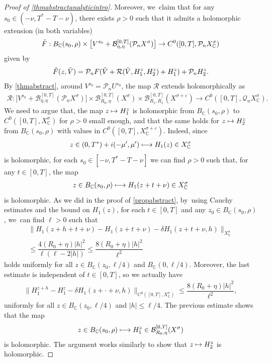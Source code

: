 \documentclass[JEP,XML,SOM,Unicode,published]{cedram}
\newcommand\mto{\mathchoice{\longmapsto}{\mapsto}{\mapsto}{\mapsto}}
\theoremstyle{definition}
\let\mc\mathcal
\let\veps\varepsilon
\newcommand{\B}{\mc{B}}
\newcommand{\Q}{\mathcal{Q}}
\renewcommand{\P}{\mathcal{P}}
\providecommand{\norm}[1]{\lVert#1\rVert}
\begin{document}
\begin{proof}[Proof of \cref{thmabstractanalyticintro}]
Moreover, we~claim that for any $s_0\in (-\nu,T^*-T-\nu)$, there exists $\rho>0$ such that it admits a holomorphic extension (in both variables)
\begin{align*}
\Tilde{F}: B_{\mathbb{C}}(s_0, \rho)\times \bigl[V^{s_0}+\B_{\eta,\eta}^{[0,T]}(\P_n X^{\sigma})\bigr]\to C^0([0, T], \P_n X_\mathbb{C}^\sigma)
\end{align*}
given by
\begin{align*}
\Tilde{F}(z,\Tilde{V})=\P_n F(\Tilde{V}+\mathcal{R}(\Tilde{V},H_{1}^z,H_{2}^z)+H_{1}^z)+\P_n H_{2}^z.
\end{align*}
By \cref{thmabstract}, around $V^{s_0}=\P_n U^{s_0}$, the map $\mc{R}$ extends holomorphically as
\begin{align*}
\mathcal{R}: \bigl[ V^{s_0}+ \B_{\eta,\eta}^{[0,T]}(\P_n X^{\sigma})\bigr] \times \B_{R_{0},\eta}^{[0,T]}(X^{\sigma}) \times \B_{R_{1},R_{1}}^{[0,T]}(X^{\sigma+\veps}) \to C^0([0, T], \Q_{n }X_\mathbb{C}^{\sigma}).
\end{align*}
We need to argue that, the map $z\mto H_1^z$ is holomorphic from $B_{\mathbb{C}}(s_0, \rho)$ to $C^0([0, T], X_\mathbb{C}^\sigma)$ for $\rho>0$ small enough, and that the same holds for $z\mto H_2^z$ from $B_{\mathbb{C}}(s_0, \rho)$ with values in $C^0([0, T], X_\mathbb{C}^{\sigma+\veps})$. Indeed, since
\begin{align*}
z\in (0, T^*)+i(-\mu', \mu')\mto H_1(z)\in X_\mathbb{C}^\sigma
\end{align*}
is holomorphic, for each $s_0\in [-\nu, T^*-T-\nu]$ we can find $\rho>0$ such that, for any $t\in [0, T]$, the map
\begin{align*}
z\in B_\mathbb{C}(s_0, \rho)\mto H_1(z+t+\nu)\in X_\mathbb{C}^\sigma
\end{align*}
is holomorphic. As we did in the proof of \cref{propabstract}, by~using Cauchy estimates and the bound on $H_1(z)$, for each $t\in [0, T]$ and any $z_0\in B_\mathbb{C}(s_0, \rho)$, we~can find $\ell>0$ such that
\begin{multline*}
\norm{H_1(z+h+t+\nu)-H_1(z+t+\nu)-\delta H_1(z+t+\nu, h)}_{X_\mathbb{C}^\sigma}\\
\leq \dfrac{4(R_0+\eta)|h|^2}{\ell(\ell-2|h|)}\leq \dfrac{8(R_0+\eta)|h|^2}{\ell^2}
\end{multline*}
holds uniformly for all $z\in B_\mathbb{C}(z_0, \ell/4)$ and $B_\mathbb{C}(0, \ell/4)$. Moreover, the last estimate is independent of $t\in [0, T]$, so we actually have
\begin{align*}
\norm{H_1^{z+h}-H_1^z-\delta H_1(z+\cdot+\nu, h)}_{C^0([0, T], X_\mathbb{C}^\sigma)}\leq \dfrac{8(R_0+\eta)|h|^2}{\ell^2},
\end{align*}
uniformly for all $z\in B_\mathbb{C}(z_0, \ell/4)$ and $|h|\leq \ell/4$. The previous estimate shows that the map
\begin{align*}
z\in B_\mathbb{C}(s_0, \rho)\mto H_1^z\in \B_{R_0, \eta}^{[0, T]}(X^\sigma)
\end{align*}
is holomorphic. The argument works similarly to show that $z\mto H_2^z$ is holomorphic.


\end{proof}
\end{document}
